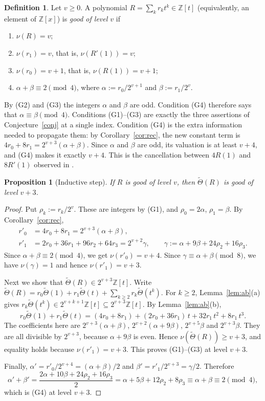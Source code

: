 \documentclass[11pt]{amsart}
\newtheorem{proposition}[theorem]{Proposition}
\theoremstyle{definition}
\newtheorem{definition}[theorem]{Definition}
\theoremstyle{remark}
\newcommand{\Z}{\mathbb{Z}}
\newcommand{\Th}{\widetilde{\Theta}}
\begin{document}
\begin{definition}\label{def:good}
Let $v\ge0$. A polynomial $R=\sum_kr_kt^k\in\Z[t]$ (equivalently, an element of $\Z[x]$) is \emph{good of level $v$} if
\begin{enumerate}[(G1)]
\item $\nu(R)=v$;
\item $\nu(r_1)=v$, that is, $\nu(R'(1))=v$;
\item $\nu(r_0)=v+1$, that is, $\nu(R(1))=v+1$;
\item $\alpha+\beta\equiv2\pmod 4$, where $\alpha:=r_0/2^{v+1}$ and $\beta:=r_1/2^{v}$.
\end{enumerate}
\end{definition}
By (G2) and (G3) the integers $\alpha$ and $\beta$ are odd. Condition (G4) therefore says that $\alpha\equiv\beta\pmod4$. Conditions (G1)--(G3) are exactly the three assertions of Conjecture~\ref{conj} at a single index. Condition (G4) is the extra information needed to propagate them: by Corollary~\ref{cor:rec}, the new constant term is $4r_0+8r_1=2^{v+3}(\alpha+\beta)$. Since $\alpha$ and $\beta$ are odd, its valuation is at least $v+4$, and (G4) makes it exactly $v+4$. This is the cancellation between $4R(1)$ and $8R'(1)$ observed in \cite[\S6]{ST}.

\begin{proposition}[Inductive step]\label{prop:step}
If $R$ is good of level $v$, then $\Th(R)$ is good of level $v+3$.
\end{proposition}
\begin{proof}
Put $\rho_k:=r_k/2^v$. These are integers by (G1), and $\rho_0=2\alpha$, $\rho_1=\beta$. By Corollary~\ref{cor:rec},
\begin{align*}
  r'_0&=4r_0+8r_1=2^{v+3}(\alpha+\beta),\\
  r'_1&=2r_0+36r_1+96r_2+64r_3=2^{v+2}\gamma,\qquad \gamma:=\alpha+9\beta+24\rho_2+16\rho_3 .
\end{align*}
Since $\alpha+\beta\equiv2\pmod4$, we get $\nu(r'_0)=v+4$. Since $\gamma\equiv\alpha+\beta\pmod 8$, we have $\nu(\gamma)=1$ and hence $\nu(r'_1)=v+3$.

Next we show that $\Th(R)\in 2^{v+3}\Z[t]$. Write $\Th(R)=r_0\Th(1)+r_1\Th(t)+\sum_{k\ge2}r_k\Th(t^k)$. For $k\ge2$, Lemma~\ref{lem:ab}(a) gives $r_k\Th(t^k)\in2^{v+k+1}\Z[t]\subseteq 2^{v+3}\Z[t]$. By Lemma~\ref{lem:ab}(b),
\[
  r_0\Th(1)+r_1\Th(t)=(4r_0+8r_1)+(2r_0+36r_1)\,t+32r_1\,t^2+8r_1\,t^3 .
\]
The coefficients here are $2^{v+3}(\alpha+\beta)$, $2^{v+2}(\alpha+9\beta)$, $2^{v+5}\beta$ and $2^{v+3}\beta$. They are all divisible by $2^{v+3}$, because $\alpha+9\beta$ is even. Hence $\nu(\Th(R))\ge v+3$, and equality holds because $\nu(r'_1)=v+3$. This proves (G1)--(G3) at level $v+3$.

Finally, $\alpha'=r'_0/2^{v+4}=(\alpha+\beta)/2$ and $\beta'=r'_1/2^{v+3}=\gamma/2$. Therefore
\[
  \alpha'+\beta'=\frac{2\alpha+10\beta+24\rho_2+16\rho_3}{2}=\alpha+5\beta+12\rho_2+8\rho_3\equiv\alpha+\beta\equiv2\pmod4,
\]
which is (G4) at level $v+3$.
\end{proof}
\end{document}
